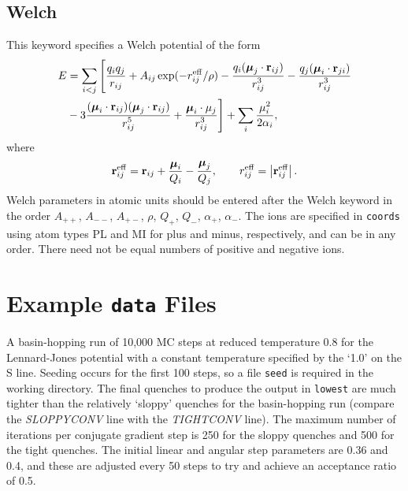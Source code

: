 {\subsection{Welch}This keyword specifies a Welch potential\cite{welchld76,phillipscb91} of the form
\begin{eqnarray*}
E &= \sum_{i<j}\Bigg[ {\displaystyle q_i q_j\over\displaystyle  r_{ij}} + A_{ij}\exp(-r_{ij}^{\rm eff}/\rho)
              -{\displaystyle q_i({\boldsymbol \mu}_j\cdot{\bf r}_{ij})\over\displaystyle  r_{ij}^3}
              -{\displaystyle q_j({\boldsymbol \mu}_i\cdot{\bf r}_{ji})\over\displaystyle  r_{ij}^3} \\
             &-3{\displaystyle   ({\boldsymbol \mu}_i\cdot{\bf r}_{ij})
                   ({\boldsymbol \mu}_j\cdot{\bf r}_{ij})\over\displaystyle  r_{ij}^5}
              +{\displaystyle  {\boldsymbol \mu}_i\cdot{{\bf{\mu}}}_j\over\displaystyle  r_{ij}^3}\Bigg]
              +\sum_i {\displaystyle \mu_i^2\over\displaystyle 2\alpha_i}, \\
\end{eqnarray*}
where
$$ {\bf r}_{ij}^{\rm eff}={\bf r}_{ij}+{{\boldsymbol \mu}_i\over Q_i}-{{\boldsymbol \mu}_j\over Q_j},
    \qquad r_{ij}^{\rm eff}=\left|{\bf r}_{ij}^{\rm eff}\right|. $$
Welch parameters in atomic units should be
entered after the Welch keyword in the order $A_{++}$, $A_{--}$, $A_{+-}$, $\rho$, $Q_+$,
$Q_-$, $\alpha_+$, $\alpha_-$.
The ions are specified in {\tt coords}  using atom types PL and MI for plus and minus, respectively,
and can be in any order. There need not be equal numbers of positive and negative ions.



\section{Example {\tt data} Files}

A basin-hopping run of 10,000 MC steps at reduced temperature $0.8$ for the Lennard-Jones potential
with a constant temperature specified by the `1.0' on the {S\/} line.
Seeding occurs for the first 100 steps, so a file {\tt seed} is required in the 
working directory. The final quenches to produce the output in {\tt lowest} are much
tighter than the relatively `sloppy' quenches for the basin-hopping run (compare the
{\it SLOPPYCONV\/} line with the {\it TIGHTCONV\/} line). The maximum number of iterations per
conjugate gradient step is 250 for the sloppy quenches and 500 for the tight quenches.
The initial linear and angular step parameters are 0.36 and 0.4, and these are adjusted
every 50 steps to try and achieve an acceptance ratio of 0.5.

}
